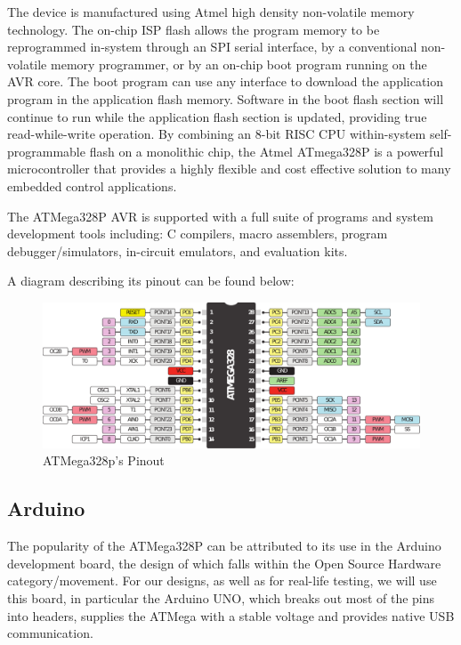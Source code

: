 The device is manufactured using Atmel high density non-volatile memory technology. The on-chip ISP flash allows the program memory to be reprogrammed in-system through an SPI serial interface, by a conventional non-volatile memory programmer, or by an on-chip boot program running on the AVR core. The boot program can use any interface to download the application program in the application flash memory. Software in the boot flash section will continue to run while the application flash section is updated, providing true read-while-write operation. By combining an 8-bit RISC CPU within-system self-programmable flash on a monolithic chip, the Atmel ATmega328P is a powerful microcontroller that provides a highly flexible and cost effective solution to many embedded control applications.\medskip

The ATMega328P AVR is supported with a full suite of programs and system development tools including: C compilers, macro assemblers, program debugger/simulators, in-circuit emulators, and evaluation kits.~\autocite{ATMEGA328P}\medskip

A diagram describing its pinout can be found below:

\begin{figure}[H]
    \centering
    \includegraphics[scale = 0.55]{Graphics/MICROS/Practice 1/ARDUINO/ATMEGA328P_PINOUT.pdf}
    \caption{ATMega328p's Pinout~\autocite{ATMEGA328P_PINOUT}}
    \label{fig:ATMEGA328P_PINOUT}
\end{figure}


\subsection{Arduino}
\label{sec:ARDUINO}

The popularity of the ATMega328P can be attributed to its use in the Arduino development board, the design of which falls within the Open Source Hardware category/movement. For our designs, as well as for real-life testing, we will use this board, in particular the Arduino UNO, which breaks out most of the pins into headers, supplies the ATMega with a stable voltage and provides native USB communication.\medskip

